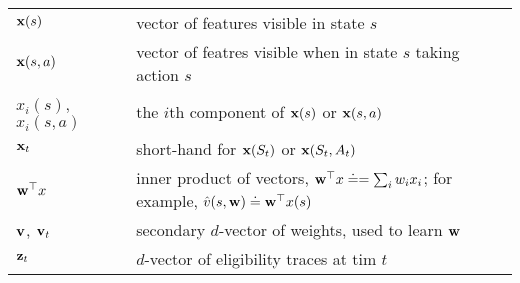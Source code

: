 \documentclass[8pt, landscape]{article}
\begin{document}
\begin{multicols}{3}
        \begin{tabular}{ p{} p{} }
            $\vb{x}(s)$          & vector of features visible in state $s$                                                                                  \\
            $\vb{x}(s,a)$        & vector of featres visible when in state $s$ taking action $s$                                                            \\
            $x_i(s)$, $x_i(s,a)$ & the $i$th component of $\vb{x}(s)$ or $\vb{x}(s,a)$                                                                      \\
            $\vb{x}_t$           & short-hand for $\vb{x}(S_t)$ or $\vb{x}(S_t, A_t)$                                                                       \\
            $\vb{w}^\top x$      & inner product of vectors, $\vb{w}^\top x\doteq=\sum_{i}w_i x_i$; for example, $\hat{v}(s,\vb{w})\doteq \vb{w}^\top x(s)$ \\
            $\vb{v}$, $\vb{v}_t$ & secondary $d$-vector of weights, used to learn $\vb{w}$                                                                  \\
            $\vb{z}_t$           & $d$-vector of eligibility traces at tim $t$                                                                              \\
        \end{tabular}

    \end{multicols}

    \newpage
\end{document}
